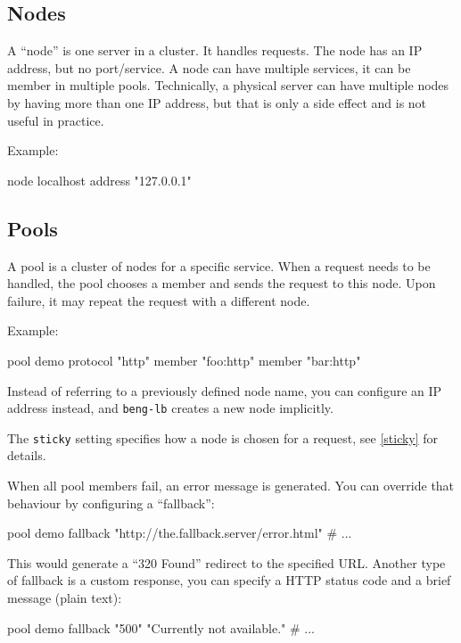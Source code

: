 \documentclass[a4paper,12pt]{article}
\begin{document}
\subsection{Nodes}

A ``node'' is one server in a cluster.  It handles requests.  The node
has an IP address, but no port/service.  A node can have multiple
services, it can be member in multiple pools.  Technically, a physical
server can have multiple nodes by having more than one IP address, but
that is only a side effect and is not useful in practice.

Example:

\begin{verbatim*}
node localhost {
  address "127.0.0.1"
}
\end{verbatim*}

\subsection{Pools}

A pool is a cluster of nodes for a specific service.  When a request
needs to be handled, the pool chooses a member and sends the request
to this node.  Upon failure, it may repeat the request with a
different node.

Example:

\begin{verbatim*}
pool demo {
  protocol "http"
  member "foo:http"
  member "bar:http"
}
\end{verbatim*}

Instead of referring to a previously defined node name, you can
configure an IP address instead, and \texttt{beng-lb} creates a new
node implicitly.

The \verb|sticky| setting specifies how a node is chosen for a
request, see \ref{sticky} for details.

When all pool members fail, an error message is generated.  You can
override that behaviour by configuring a ``fallback'':

\begin{verbatim*}
pool demo {
  fallback "http://the.fallback.server/error.html"
  # ...
}
\end{verbatim*}

This would generate a ``320 Found'' redirect to the specified URL.
Another type of fallback is a custom response, you can specify a HTTP
status code and a brief message (plain text):

\begin{verbatim*}
pool demo {
  fallback "500" "Currently not available."
  # ...
}
\end{verbatim*}
\end{document}
